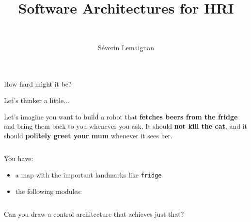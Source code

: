 \documentclass[compress]{beamer}
\title{Software Architectures for HRI}
\subtitle{~}
\date{}
\author{Séverin Lemaignan}
\institute{{\bf Bristol Robotics Lab}\\University of the West of England}
\makeatletter
\let\beamer@writeslidentry@miniframeson=\beamer@writeslidentry
\def\beamer@writeslidentry@miniframesoff{%
  \expandafter\beamer@ifempty\expandafter{\beamer@framestartpage}{}%
  {%
    \clearpage\beamer@notesactions%
  }
}
\newcommand*{\miniframeson}{\let\beamer@writeslidentry=\beamer@writeslidentry@miniframeson}
\newcommand*{\miniframesoff}{\let\beamer@writeslidentry=\beamer@writeslidentry@miniframesoff}
\makeatother
\begin{document}
\miniframesoff


\maketitle

\miniframeson

\begin{frame}[plain]{}

    \Large

    \centering
    How hard might it be?

\end{frame}


\begin{frame}{Let's thinker a little...}

    Let's imagine you want to build a robot that {\bf fetches beers from the fridge}
    and bring them back to you whenever you ask. It should {\bf not kill the cat},
    and it should {\bf politely greet your mum} whenever it sees her.

    \begin{columns}
        \begin{column}{0.5\linewidth}

            You have:
            \begin{itemize}
                \item a map with the important landmarks like {\tt fridge}
                \item the following modules:
            \end{itemize}
        \end{column}
        \begin{column}{0.5\linewidth}
            \begin{center}
            \end{center}
        \end{column}
    \end{columns}

    Can you draw a control architecture that achieves just that?
\end{frame}
\end{document}
